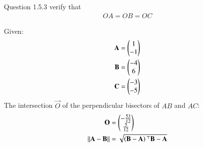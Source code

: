 \documentclass[journal,12pt,twocolumn]{IEEEtran}
\theoremstyle{remark}
\begin{document}
Question 1.5.3
verify that 
\begin{align}OA = OB = OC\end{align}
\solution

Given:
\begin{align}
\mathbf{A} = \begin{pmatrix}1\\-1\end{pmatrix}\\
\mathbf{B} = \begin{pmatrix}-4\\6\end{pmatrix}\\
\mathbf{C} = \begin{pmatrix}-3\\-5\end{pmatrix}
\end{align}
The intersection $\vec{O}$ of the perpendicular bisectors of $AB$ and $AC$:
\begin{align}
\mathbf{O} &= \begin{pmatrix}-\frac{53}{12} \\ \frac{5}{12}\end{pmatrix}\\
\left\lVert\mathbf{A} - \mathbf{B}\right\rVert &= \sqrt{\left(\mathbf{B}-\mathbf{A}\right){^\top}\mathbf{B}-\mathbf{A}}
\end{align}
\end{document}
